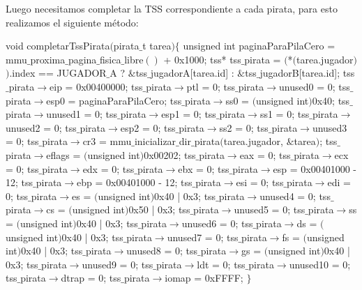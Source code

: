 Luego necesitamos completar la TSS correspondiente a cada pirata, para esto realizamos el siguiente m\'etodo:

\begin{algorithmic}
\State \tab void completarTssPirata$($pirata$\_$t tarea$) \{$
  \State \tab \tab unsigned int paginaParaPilaCero = mmu$\_$proxima$\_$pagina$\_$fisica$\_$libre$()$ + 0x1000;
\State \tab \tab 
  \State \tab \tab tss* tss$\_$pirata = $($*$($tarea.jugador$)$$)$.index == JUGADOR$\_$A ? $\&$tss$\_$jugadorA[tarea.id] : $\&$tss$\_$jugadorB[tarea.id];
\State \tab \tab 
  \State \tab \tab tss$\_$pirata$\to$eip = 0x00400000;
  \State \tab \tab tss$\_$pirata$\to$ptl = 0;
  \State \tab \tab tss$\_$pirata$\to$unused0 = 0;
  \State \tab \tab tss$\_$pirata$\to$esp0 = paginaParaPilaCero;
  \State \tab \tab tss$\_$pirata$\to$ss0 = $($unsigned int$)$0x40;
  \State \tab \tab tss$\_$pirata$\to$unused1 = 0;
  \State \tab \tab tss$\_$pirata$\to$esp1 = 0;
  \State \tab \tab tss$\_$pirata$\to$ss1 = 0;
  \State \tab \tab tss$\_$pirata$\to$unused2 = 0;
  \State \tab \tab tss$\_$pirata$\to$esp2 = 0;
  \State \tab \tab tss$\_$pirata$\to$ss2 = 0;
  \State \tab \tab tss$\_$pirata$\to$unused3 = 0;
  \State \tab \tab tss$\_$pirata$\to$cr3 = mmu$\_$inicializar$\_$dir$\_$pirata$($tarea.jugador, $\&$tarea$)$;
  \State \tab \tab tss$\_$pirata$\to$eflags = $($unsigned int$)$0x00202;
  \State \tab \tab tss$\_$pirata$\to$eax = 0;
  \State \tab \tab tss$\_$pirata$\to$ecx = 0;
  \State \tab \tab tss$\_$pirata$\to$edx = 0;
  \State \tab \tab tss$\_$pirata$\to$ebx = 0;
  \State \tab \tab tss$\_$pirata$\to$esp = 0x00401000 - 12;
  \State \tab \tab tss$\_$pirata$\to$ebp = 0x00401000 - 12;
  \State \tab \tab tss$\_$pirata$\to$esi = 0;
  \State \tab \tab tss$\_$pirata$\to$edi = 0;
  \State \tab \tab tss$\_$pirata$\to$es = $($unsigned int$)$0x40 | 0x3;
  \State \tab \tab tss$\_$pirata$\to$unused4 = 0;
  \State \tab \tab tss$\_$pirata$\to$cs = $($unsigned int$)$0x50 | 0x3;
  \State \tab \tab tss$\_$pirata$\to$unused5 = 0;
  \State \tab \tab tss$\_$pirata$\to$ss = $($unsigned int$)$0x40 | 0x3;
  \State \tab \tab tss$\_$pirata$\to$unused6 = 0;
  \State \tab \tab tss$\_$pirata$\to$ds = $($unsigned int$)$0x40 | 0x3;
  \State \tab \tab tss$\_$pirata$\to$unused7 = 0;
  \State \tab \tab tss$\_$pirata$\to$fs = $($unsigned int$)$0x40 | 0x3;
  \State \tab \tab tss$\_$pirata$\to$unused8 = 0;
  \State \tab \tab tss$\_$pirata$\to$gs = $($unsigned int$)$0x40 | 0x3;
  \State \tab \tab tss$\_$pirata$\to$unused9 = 0;
  \State \tab \tab tss$\_$pirata$\to$ldt = 0;
  \State \tab \tab tss$\_$pirata$\to$unused10 = 0;
  \State \tab \tab tss$\_$pirata$\to$dtrap = 0;
  \State \tab \tab tss$\_$pirata$\to$iomap = 0xFFFF;
\State \tab $\}$
\end{algorithmic}

